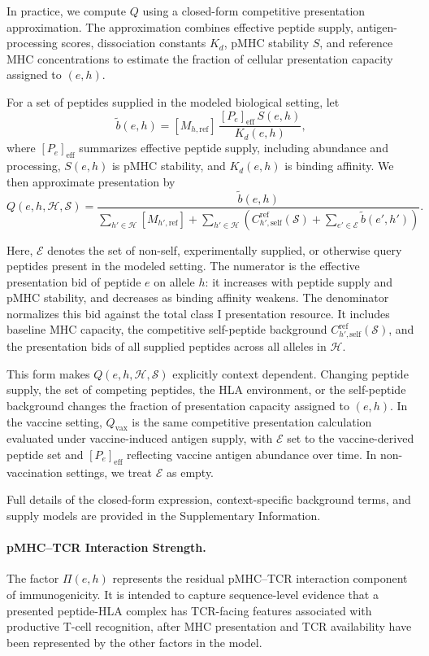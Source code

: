\documentclass[11pt]{article}
\begin{document}
In practice, we compute \(Q\) using a closed-form competitive presentation approximation. The approximation combines effective peptide supply, antigen-processing scores, dissociation constants \(K_d\), pMHC stability \(S\), and reference MHC concentrations to estimate the fraction of cellular presentation capacity assigned to \((e,h)\). 

For a set of peptides supplied in the modeled biological setting, let
\[
\widetilde b(e,h)
=
[M_{h,\mathrm{ref}}]\,
\frac{[P_e]_{\mathrm{eff}}\,S(e,h)}{K_d(e,h)},
\]
where \([P_e]_{\mathrm{eff}}\) summarizes effective peptide supply, including abundance and processing, \(S(e,h)\) is pMHC stability, and \(K_d(e,h)\) is binding affinity. We then approximate presentation by
\[
Q(e,h,\mathcal{H},\mathcal{S})
=
\frac{\widetilde b(e,h)}
{\sum_{h'\in\mathcal{H}}[M_{h',\mathrm{ref}}]
+
\sum_{h'\in\mathcal{H}}
\left(
C^{\mathrm{ref}}_{h',\mathrm{self}}(\mathcal{S})
+
\sum_{e'\in\mathcal{E}}
\widetilde b(e',h')
\right)}.
\]

Here, \(\mathcal{E}\) denotes the set of non-self, experimentally supplied, or otherwise query peptides present in the modeled setting. The numerator is the effective presentation bid of peptide \(e\) on allele \(h\): it increases with peptide supply and pMHC stability, and decreases as binding affinity weakens. The denominator normalizes this bid against the total class I presentation resource. It includes baseline MHC capacity, the competitive self-peptide background \(C^{\mathrm{ref}}_{h',\mathrm{self}}(\mathcal{S})\), and the presentation bids of all supplied peptides across all alleles in \(\mathcal{H}\).

This form makes \(Q(e,h,\mathcal{H},\mathcal{S})\) explicitly context dependent. Changing peptide supply, the set of competing peptides, the HLA environment, or the self-peptide background changes the fraction of presentation capacity assigned to \((e,h)\). In the vaccine setting, \(Q_{\mathrm{vax}}\) is the same competitive presentation calculation evaluated under vaccine-induced antigen supply, with \(\mathcal{E}\) set to the vaccine-derived peptide set and \([P_e]_{\mathrm{eff}}\) reflecting vaccine antigen abundance over time. In non-vaccination settings, we treat \(\mathcal{E}\) as empty.

Full details of the closed-form expression, context-specific background terms, and supply models are provided in the Supplementary Information.
\paragraph{pMHC--TCR Interaction Strength.}
The factor \(\Pi(e,h)\) represents the residual pMHC--TCR interaction component of immunogenicity. It is intended to capture sequence-level evidence that a presented peptide-HLA complex has TCR-facing features associated with productive T-cell recognition, after MHC presentation and TCR availability have been represented by the other factors in the model.
\end{document}
